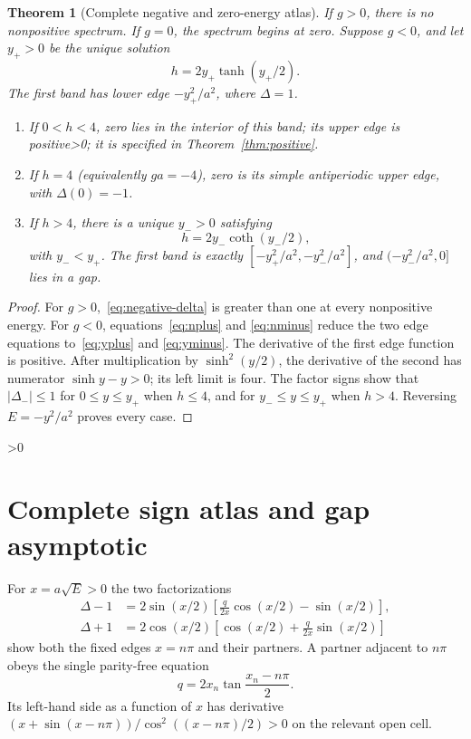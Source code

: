 \documentclass[10pt]{article}
\providecommand{\CRevisionRound}{2}
\newtheorem{theorem}{Theorem}
\begin{document}
\begin{theorem}[Complete negative and zero-energy atlas]\label{thm:negative}
If $g>0$, there is no nonpositive spectrum.  If $g=0$, the spectrum begins
at zero.  Suppose $g<0$, and let $y_+>0$ be the unique solution
\begin{equation}\label{eq:yplus}
 h=2y_+\tanh(y_+/2).
\end{equation}
The first band has lower edge $-y_+^2/a^2$, where $\Delta=1$.
\begin{enumerate}
\item If $0<h<4$, zero lies in the interior of this band; its upper edge is
positive\ifnum\CRevisionRound>0; it is specified in
Theorem~\ref{thm:positive}\fi.
\item If $h=4$ (equivalently $ga=-4$), zero is its simple antiperiodic upper
edge, with $\Delta(0)=-1$.
\item If $h>4$, there is a unique $y_->0$ satisfying
\begin{equation}\label{eq:yminus}
 h=2y_-\coth(y_-/2),
\end{equation}
with $y_-<y_+$.  The first band is exactly
$[-y_+^2/a^2,-y_-^2/a^2]$, and $(-y_-^2/a^2,0]$ lies in a gap.
\end{enumerate}
\end{theorem}
\begin{proof}
For $g>0$,~\eqref{eq:negative-delta} is greater than one at every
nonpositive energy.  For $g<0$, equations~\eqref{eq:nplus} and
\eqref{eq:nminus} reduce the two edge equations to~\eqref{eq:yplus} and
\eqref{eq:yminus}.  The derivative of the first edge function is positive.
After multiplication by $\sinh^2(y/2)$, the derivative of the second has
numerator $\sinh y-y>0$; its left limit is four.  The factor signs show that
$|\Delta_-|\leq1$ for $0\leq y\leq y_+$ when $h\leq4$, and for
$y_-\leq y\leq y_+$ when $h>4$.  Reversing $E=-y^2/a^2$ proves every case.
\end{proof}

\ifnum\CRevisionRound>0
\section{Complete sign atlas and gap asymptotic}
For $x=a\sqrt E>0$ the two factorizations
\begin{align}
 \Delta-1&=2\sin(x/2)[\frac{q}{2x}\cos(x/2)-\sin(x/2)],\label{eq:pplus}\\
 \Delta+1&=2\cos(x/2)[\cos(x/2)+\frac{q}{2x}\sin(x/2)]\label{eq:pminus}
\end{align}
show both the fixed edges $x=n\pi$ and their partners.  A partner adjacent
to $n\pi$ obeys the single parity-free equation
\begin{equation}\label{eq:partner}
 q=2x_n\tan\frac{x_n-n\pi}{2}.
\end{equation}
Its left-hand side as a function of $x$ has derivative
$(x+\sin(x-n\pi))/\cos^2((x-n\pi)/2)>0$ on the relevant open cell.
\end{document}
